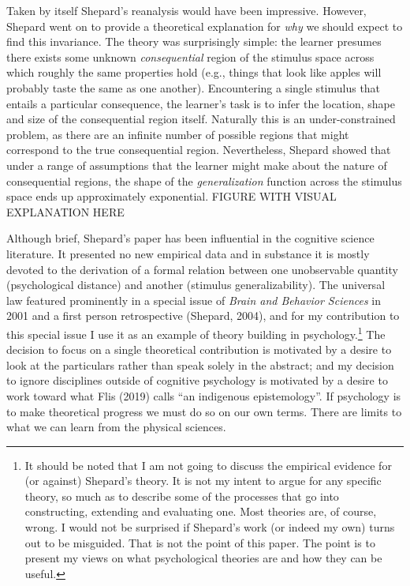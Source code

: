 \documentclass[
  english,
  doc]{apa6}
\begin{document}
Taken by itself Shepard's reanalysis would have been impressive. However, Shepard went on to provide a theoretical explanation for \emph{why} we should expect to find this invariance. The theory was surprisingly simple: the learner presumes there exists some unknown \emph{consequential} region of the stimulus space across which roughly the same properties hold (e.g., things that look like apples will probably taste the same as one another). Encountering a single stimulus that entails a particular consequence, the learner's task is to infer the location, shape and size of the consequential region itself. Naturally this is an under-constrained problem, as there are an infinite number of possible regions that might correspond to the true consequential region. Nevertheless, Shepard showed that under a range of assumptions that the learner might make about the nature of consequential regions, the shape of the \emph{generalization} function across the stimulus space ends up approximately exponential. FIGURE WITH VISUAL EXPLANATION HERE

Although brief, Shepard's paper has been influential in the cognitive science literature. It presented no new empirical data and in substance it is mostly devoted to the derivation of a formal relation between one unobservable quantity (psychological distance) and another (stimulus generalizability). The universal law featured prominently in a special issue of \emph{Brain and Behavior Sciences} in 2001 and a first person retrospective (Shepard, 2004), and for my contribution to this special issue I use it as an example of theory building in psychology.\footnote{It should be noted that I am not going to discuss the empirical evidence for (or against) Shepard's theory. It is not my intent to argue for any specific theory, so much as to describe some of the processes that go into constructing, extending and evaluating one. Most theories are, of course, wrong. I would not be surprised if Shepard's work (or indeed my own) turns out to be misguided. That is not the point of this paper. The point is to present my views on what psychological theories are and how they can be useful.} The decision to focus on a single theoretical contribution is motivated by a desire to look at the particulars rather than speak solely in the abstract; and my decision to ignore disciplines outside of cognitive psychology is motivated by a desire to work toward what Flis (2019) calls \enquote{an indigenous epistemology}. If psychology is to make theoretical progress we must do so on our own terms. There are limits to what we can learn from the physical sciences.
\end{document}
